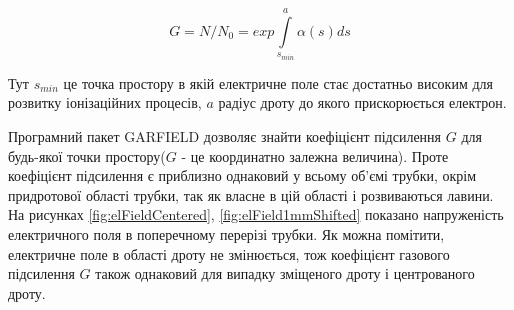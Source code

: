 \documentclass[pdftex,14pt]{scrartcl}
\begin{document}
\begin{spacing}{1.5}
	
	\begin{equation}
	G = N/N_0 = exp \int\limits_{s_{min}}^{a} \alpha(s) ds
	\label{eq:gain}
	\end{equation}
	
	Тут 	$s_{min}$ це точка простору в якій електричне поле стає достатньо високим для розвитку іонізаційних процесів, $a$ радіус дроту до якого прискорюється електрон.
	
	Програмний пакет GARFIELD дозволяє знайти коефіцієнт підсилення $G$ для будь-якої точки простору($G$ - це координатно залежна величина). Проте коефіцієнт підсилення є приблизно однаковий у всьому об’ємі трубки, окрім придротової області трубки, так як власне в цій області і розвиваються лавини. На рисунках \ref{fig:elFieldCentered}, \ref{fig:elField1mmShifted} показано напруженість електричного поля в поперечному перерізі трубки. Як можна помітити, електричне поле в області дроту не змінюється, тож коефіцієнт газового підсилення $G$ також однаковий для випадку зміщеного дроту і центрованого дроту. 
	
	

\end{spacing}
\end{document}
